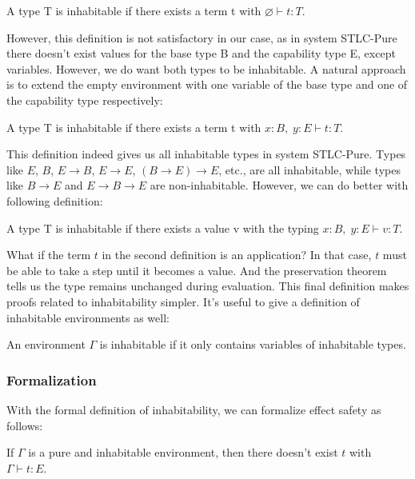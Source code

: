 \begin{definition}
  A type T is inhabitable if there exists a term t with $\varnothing
  \vdash t : T$.
\end{definition}

However, this definition is not satisfactory in our case, as in system
STLC-Pure there doesn't exist values for the base type B and the
capability type E, except variables. However, we do want both types to
be inhabitable. A natural approach is to extend the empty environment
with one variable of the base type and one of the capability type
respectively:

\begin{definition}
  A type T is inhabitable if there exists a term t with
  $x:B,\; y:E \vdash t : T$.
\end{definition}

This definition indeed gives us all inhabitable types in system
STLC-Pure. Types like $E$, $B$, $E \to B$, $E \to E$,
$(B \to E) \to E$, etc., are all inhabitable, while types like
$B \to E$ and $E \to B \to E$ are non-inhabitable. However, we can do
better with following definition:

\begin{definition}
  A type T is inhabitable if there exists a value v with the typing
  $x:B,\; y:E \vdash v : T$.
\end{definition}

What if the term $t$ in the second definition is an application? In
that case, $t$ must be able to take a step until it becomes a
value. And the preservation theorem tells us the type remains
unchanged during evaluation. This final definition makes proofs
related to inhabitability simpler. It's useful to give a definition of
inhabitable environments as well:

\begin{definition}
  An environment $\Gamma$ is inhabitable if it only contains variables
  of inhabitable types.
\end{definition}

\subsubsection{Formalization}

With the formal definition of inhabitability, we can formalize effect
safety as follows:

\begin{definition}
  If $\Gamma$ is a pure and inhabitable environment, then there
  doesn't exist $t$ with $\Gamma \vdash t : E$.
\end{definition}

